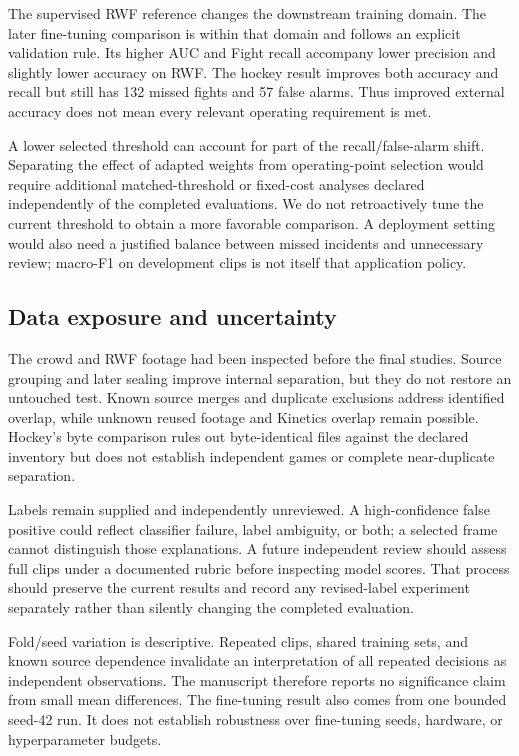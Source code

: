 The supervised RWF reference changes the downstream training domain. The later fine-tuning comparison is within that domain and follows an explicit validation rule. Its higher AUC and Fight recall accompany lower precision and slightly lower accuracy on RWF. The hockey result improves both accuracy and recall but still has 132 missed fights and 57 false alarms. Thus improved external accuracy does not mean every relevant operating requirement is met.

A lower selected threshold can account for part of the recall/false-alarm shift. Separating the effect of adapted weights from operating-point selection would require additional matched-threshold or fixed-cost analyses declared independently of the completed evaluations. We do not retroactively tune the current threshold to obtain a more favorable comparison. A deployment setting would also need a justified balance between missed incidents and unnecessary review; macro-F1 on development clips is not itself that application policy.

\subsection{Data exposure and uncertainty}
The crowd and RWF footage had been inspected before the final studies. Source grouping and later sealing improve internal separation, but they do not restore an untouched test. Known source merges and duplicate exclusions address identified overlap, while unknown reused footage and Kinetics overlap remain possible. Hockey's byte comparison rules out byte-identical files against the declared inventory but does not establish independent games or complete near-duplicate separation.

Labels remain supplied and independently unreviewed. A high-confidence false positive could reflect classifier failure, label ambiguity, or both; a selected frame cannot distinguish those explanations. A future independent review should assess full clips under a documented rubric before inspecting model scores. That process should preserve the current results and record any revised-label experiment separately rather than silently changing the completed evaluation.

Fold/seed variation is descriptive. Repeated clips, shared training sets, and known source dependence invalidate an interpretation of all repeated decisions as independent observations. The manuscript therefore reports no significance claim from small mean differences. The fine-tuning result also comes from one bounded seed-42 run. It does not establish robustness over fine-tuning seeds, hardware, or hyperparameter budgets.

